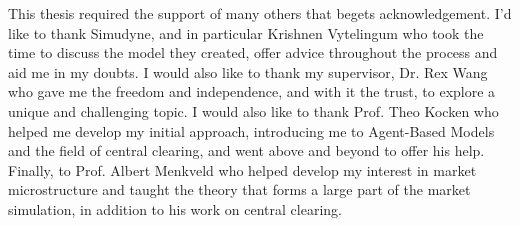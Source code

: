 This thesis required the support of many others that begets acknowledgement. I'd like to thank Simudyne, and in particular Krishnen Vytelingum who took the time to discuss the model they created, offer advice throughout the process and aid me in my doubts. I would also like to thank my supervisor, Dr. Rex Wang who gave me the freedom and independence, and with it the trust, to explore a unique and challenging topic. I would also like to thank Prof. Theo Kocken who helped me develop my initial approach, introducing me to Agent-Based Models and the field of central clearing, and went above and beyond to offer his help. Finally, to Prof. Albert Menkveld\href{}{} who helped develop my interest in market microstructure and taught the theory that forms a large part of the market simulation, in addition to his work on central clearing.